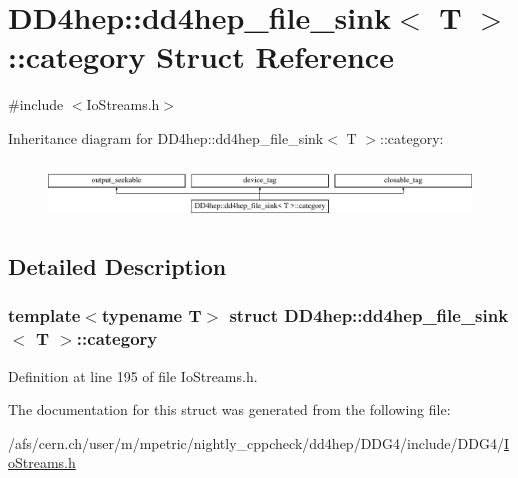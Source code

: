 \hypertarget{struct_d_d4hep_1_1dd4hep__file__sink_1_1category}{}\section{D\+D4hep\+:\+:dd4hep\+\_\+file\+\_\+sink$<$ T $>$\+:\+:category Struct Reference}
\label{struct_d_d4hep_1_1dd4hep__file__sink_1_1category}


{\ttfamily \#include $<$Io\+Streams.\+h$>$}

Inheritance diagram for D\+D4hep\+:\+:dd4hep\+\_\+file\+\_\+sink$<$ T $>$\+:\+:category\+:\begin{figure}[H]
\begin{center}
\leavevmode
\includegraphics[height=1.469816cm]{struct_d_d4hep_1_1dd4hep__file__sink_1_1category}
\end{center}
\end{figure}


\subsection{Detailed Description}
\subsubsection*{template$<$typename T$>$\newline
struct D\+D4hep\+::dd4hep\+\_\+file\+\_\+sink$<$ T $>$\+::category}



Definition at line 195 of file Io\+Streams.\+h.



The documentation for this struct was generated from the following file\+:\begin{DoxyCompactItemize}
\item 
/afs/cern.\+ch/user/m/mpetric/nightly\+\_\+cppcheck/dd4hep/\+D\+D\+G4/include/\+D\+D\+G4/\hyperlink{_io_streams_8h}{Io\+Streams.\+h}\end{DoxyCompactItemize}
